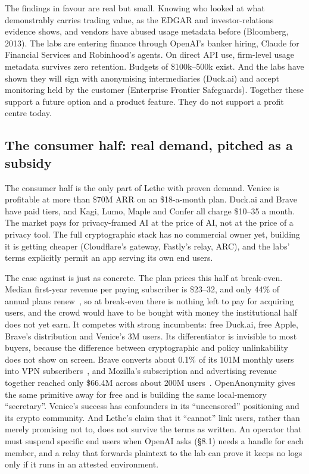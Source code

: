 \documentclass[10pt,a4paper]{article}
\begin{document}
The findings in favour are real but small. Knowing who looked at what demonstrably carries trading value, as the EDGAR and investor-relations evidence shows, and vendors have abused usage metadata before (Bloomberg, 2013). The labs are entering finance through OpenAI's banker hiring, Claude for Financial Services and Robinhood's agents. On direct API use, firm-level usage metadata survives zero retention. Budgets of \$100k--500k exist. And the labs have shown they will sign with anonymising intermediaries (Duck.ai) and accept monitoring held by the customer (Enterprise Frontier Safeguards). Together these support a future option and a product feature. They do not support a profit centre today.

\subsection{The consumer half: real demand, pitched as a subsidy}

The consumer half is the only part of Lethe with proven demand. Venice is profitable at more than \$70M ARR on an \$18-a-month plan. Duck.ai and Brave have paid tiers, and Kagi, Lumo, Maple and Confer all charge \$10--35 a month. The market pays for privacy-framed AI at the price of AI, not at the price of a privacy tool. The full cryptographic stack has no commercial owner yet, building it is getting cheaper (Cloudflare's gateway, Fastly's relay, ARC), and the labs' terms explicitly permit an app serving its own end users.

The case against is just as concrete. The plan prices this half at break-even. Median first-year revenue per paying subscriber is \$23--32, and only 44\% of annual plans renew~\cite{revenuecat-state-of-subscr}, so at break-even there is nothing left to pay for acquiring users, and the crowd would have to be bought with money the institutional half does not yet earn. It competes with strong incumbents: free Duck.ai, free Apple, Brave's distribution and Venice's 3M users. Its differentiator is invisible to most buyers, because the difference between cryptographic and policy unlinkability does not show on screen. Brave converts about 0.1\% of its 101M monthly users into VPN subscribers~\cite{brave-blog-100m-monthly}, and Mozilla's subscription and advertising revenue together reached only \$66.4M across about 200M users~\cite{mozilla-state-of-mozilla}. OpenAnonymity gives the same primitive away for free and is building the same local-memory ``secretary''. Venice's success has confounders in its ``uncensored'' positioning and its crypto community. And Lethe's claim that it ``cannot'' link users, rather than merely promising not to, does not survive the terms as written. An operator that must suspend specific end users when OpenAI asks (\S{}8.1) needs a handle for each member, and a relay that forwards plaintext to the lab can prove it keeps no logs only if it runs in an attested environment.
\end{document}
